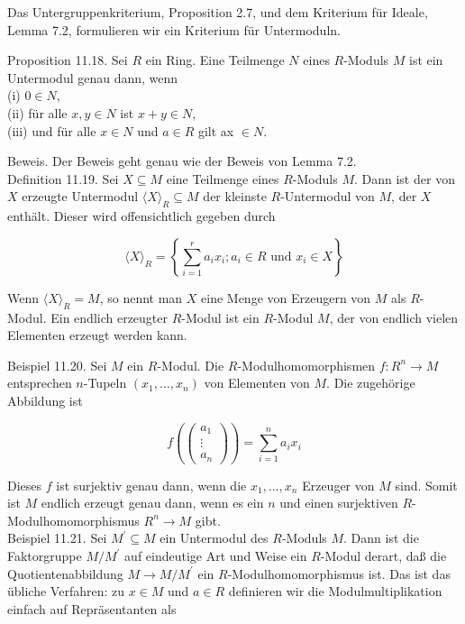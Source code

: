 \documentclass[10pt, letterpaper]{article}
\begin{document}
Das Untergruppenkriterium, Proposition 2.7, und dem Kriterium für Ideale, Lemma 7.2, formulieren wir ein Kriterium für Untermoduln.

Proposition 11.18. Sei $R$ ein Ring. Eine Teilmenge $N$ eines $R$-Moduls $M$ ist ein Untermodul genau dann, wenn\\
(i) $0 \in N$,\\
(ii) für alle $x, y \in N$ ist $x+y \in N$,\\
(iii) und für alle $x \in N$ und $a \in R$ gilt ax $\in N$.

Beweis. Der Beweis geht genau wie der Beweis von Lemma 7.2.\\
Definition 11.19. Sei $X \subseteq M$ eine Teilmenge eines $R$-Moduls $M$. Dann ist der von $X$ erzeugte Untermodul $\langle X\rangle_{R} \subseteq M$ der kleinste $R$-Untermodul von $M$, der $X$ enthält. Dieser wird offensichtlich gegeben durch

$$
\langle X\rangle_{R}=\left\{\sum_{i=1}^{r} a_{i} x_{i} ; a_{i} \in R \text { und } x_{i} \in X\right\}
$$

Wenn $\langle X\rangle_{R}=M$, so nennt man $X$ eine Menge von Erzeugern von $M$ als $R$-Modul. Ein endlich erzeugter $R$-Modul ist ein $R$-Modul $M$, der von endlich vielen Elementen erzeugt werden kann.

Beispiel 11.20. Sei $M$ ein $R$-Modul. Die $R$-Modulhomomorphismen $f: R^{n} \rightarrow M$ entsprechen $n$-Tupeln $\left(x_{1}, \ldots, x_{n}\right)$ von Elementen von $M$. Die zugehörige Abbildung ist

$$
f\left(\left(\begin{array}{c}
a_{1} \\
\vdots \\
a_{n}
\end{array}\right)\right)=\sum_{i=1}^{n} a_{i} x_{i}
$$

Dieses $f$ ist surjektiv genau dann, wenn die $x_{1}, \ldots, x_{n}$ Erzeuger von $M$ sind. Somit ist $M$ endlich erzeugt genau dann, wenn es ein $n$ und einen surjektiven $R$-Modulhomomorphismus $R^{n} \rightarrow M$ gibt.\\
Beispiel 11.21. Sei $M^{\prime} \subseteq M$ ein Untermodul des $R$-Moduls $M$. Dann ist die Faktorgruppe $M / M^{\prime}$ auf eindeutige Art und Weise ein $R$-Modul derart, daß die Quotientenabbildung $M \rightarrow M / M^{\prime}$ ein $R$-Modulhomomorphismus ist. Das ist das übliche Verfahren: zu $x \in M$ und $a \in R$ definieren wir die Modulmultiplikation einfach auf Repräsentanten als
\end{document}

